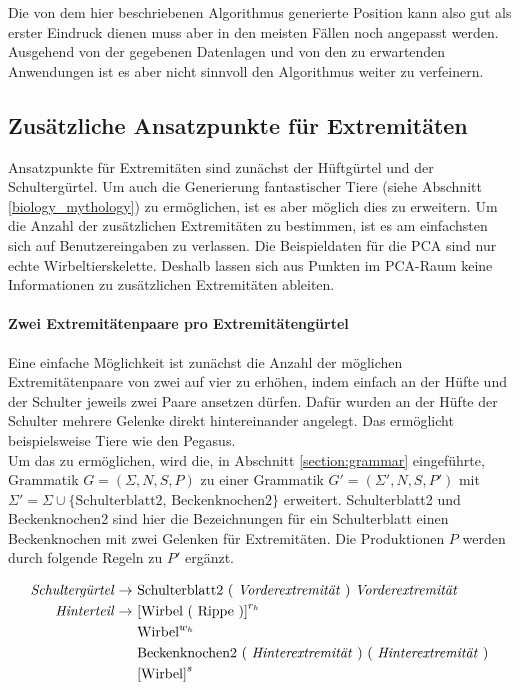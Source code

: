 Die von dem hier beschriebenen Algorithmus generierte Position kann also gut als erster Eindruck dienen muss aber in den meisten Fällen noch angepasst werden. Ausgehend von der gegebenen Datenlagen und von den zu erwartenden Anwendungen ist es aber nicht sinnvoll den Algorithmus weiter zu verfeinern.

\subsection{Zusätzliche Ansatzpunkte für Extremitäten}

Ansatzpunkte für Extremitäten sind zunächst der Hüftgürtel und der Schultergürtel. Um auch die Generierung fantastischer Tiere (siehe Abschnitt \ref{biology_mythology}) zu ermöglichen, ist es aber möglich dies zu erweitern. Um die Anzahl der zusätzlichen Extremitäten zu bestimmen, ist es am einfachsten sich auf Benutzereingaben zu verlassen. Die Beispieldaten für die PCA sind nur echte Wirbeltierskelette. Deshalb lassen sich aus Punkten im PCA-Raum keine Informationen zu zusätzlichen Extremitäten ableiten.

\paragraph{Zwei Extremitätenpaare pro Extremitätengürtel}
Eine einfache Möglichkeit ist zunächst die Anzahl der möglichen Extremitätenpaare von zwei auf vier zu erhöhen, indem einfach an der Hüfte und der Schulter jeweils zwei Paare ansetzen dürfen. Dafür wurden an der Hüfte \bzw der Schulter mehrere Gelenke direkt hintereinander angelegt. Das ermöglicht beispielsweise Tiere wie den Pegasus.\\
Um das zu ermöglichen, wird die, in Abschnitt \ref{section:grammar} eingeführte, Grammatik $G = (\Sigma, N, S, P)$ zu einer Grammatik $G' = (\Sigma', N, S, P')$ mit $\Sigma' = \Sigma \cup \{\text{Schulterblatt2, Beckenknochen2}\}$ erweitert. Schulterblatt2 und Beckenknochen2 sind hier die Bezeichnungen für ein Schulterblatt \bzw einen Beckenknochen mit zwei Gelenken für Extremitäten. Die Produktionen $P$ werden durch folgende Regeln zu $P'$ ergänzt.

\begin{align*}
 \text{\emph{Schultergürtel}} \rightarrow &\text{ Schulterblatt2 ( \emph{Vorderextremität} ) \emph{Vorderextremität}}\\
 \text{\emph{Hinterteil}} \rightarrow &\text{ [Wirbel ( Rippe )]}^{r_h}\\
    &\text{ Wirbel}^{w_h}\\
    &\text{ Beckenknochen2 ( \emph{Hinterextremität} ) ( \emph{Hinterextremität} )}\\
    &\text{ [Wirbel]}^s
\end{align*}

